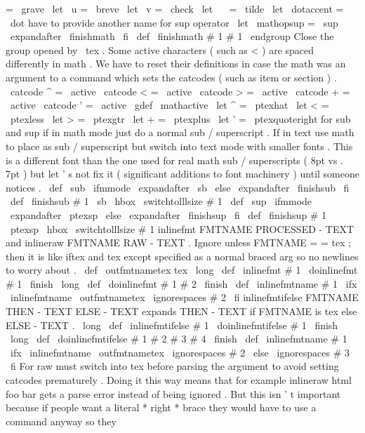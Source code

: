 {{{{=
\
grave
\
let
\
u
=
\
breve
\
let
\
v
=
\
check
\
let
\
~
=
\
tilde
\
let
\
dotaccent
=
\
dot
%
have
to
provide
another
name
for
sup
operator
\
let
\
mathopsup
=
\
sup
\
expandafter
\
finishmath
\
fi
}
\
def
\
finishmath
#
1
{
#
1
\
endgroup
}
%
Close
the
group
opened
by
\
tex
.
%
Some
active
characters
(
such
as
<
)
are
spaced
differently
in
math
.
%
We
have
to
reset
their
definitions
in
case
the
math
was
an
argument
%
to
a
command
which
sets
the
catcodes
(
such
as
item
or
section
)
.
%
{
\
catcode
^
=
\
active
\
catcode
<
=
\
active
\
catcode
>
=
\
active
\
catcode
+
=
\
active
\
catcode
'
=
\
active
\
gdef
\
mathactive
{
%
\
let
^
=
\
ptexhat
\
let
<
=
\
ptexless
\
let
>
=
\
ptexgtr
\
let
+
=
\
ptexplus
\
let
'
=
\
ptexquoteright
}
}
%
for
sub
and
sup
if
in
math
mode
just
do
a
normal
sub
/
superscript
.
%
If
in
text
use
math
to
place
as
sub
/
superscript
but
switch
%
into
text
mode
with
smaller
fonts
.
This
is
a
different
font
than
the
%
one
used
for
real
math
sub
/
superscripts
(
8pt
vs
.
7pt
)
but
let
'
s
not
%
fix
it
(
significant
additions
to
font
machinery
)
until
someone
notices
.
%
\
def
\
sub
{
\
ifmmode
\
expandafter
\
sb
\
else
\
expandafter
\
finishsub
\
fi
}
\
def
\
finishsub
#
1
{
\
sb
{
\
hbox
{
\
switchtolllsize
#
1
}
}
}
%
%
\
def
\
sup
{
\
ifmmode
\
expandafter
\
ptexsp
\
else
\
expandafter
\
finishsup
\
fi
}
\
def
\
finishsup
#
1
{
\
ptexsp
{
\
hbox
{
\
switchtolllsize
#
1
}
}
}
%
%
inlinefmt
{
FMTNAME
PROCESSED
-
TEXT
}
and
inlineraw
{
FMTNAME
RAW
-
TEXT
}
.
%
Ignore
unless
FMTNAME
=
=
tex
;
then
it
is
like
iftex
and
tex
%
except
specified
as
a
normal
braced
arg
so
no
newlines
to
worry
about
.
%
\
def
\
outfmtnametex
{
tex
}
%
\
long
\
def
\
inlinefmt
#
1
{
\
doinlinefmt
#
1
\
finish
}
\
long
\
def
\
doinlinefmt
#
1
#
2
\
finish
{
%
\
def
\
inlinefmtname
{
#
1
}
%
\
ifx
\
inlinefmtname
\
outfmtnametex
\
ignorespaces
#
2
\
fi
}
%
%
inlinefmtifelse
{
FMTNAME
THEN
-
TEXT
ELSE
-
TEXT
}
expands
THEN
-
TEXT
if
%
FMTNAME
is
tex
else
ELSE
-
TEXT
.
\
long
\
def
\
inlinefmtifelse
#
1
{
\
doinlinefmtifelse
#
1
\
finish
}
\
long
\
def
\
doinlinefmtifelse
#
1
#
2
#
3
#
4
\
finish
{
%
\
def
\
inlinefmtname
{
#
1
}
%
\
ifx
\
inlinefmtname
\
outfmtnametex
\
ignorespaces
#
2
\
else
\
ignorespaces
#
3
\
fi
}
%
%
For
raw
must
switch
into
tex
before
parsing
the
argument
to
avoid
%
setting
catcodes
prematurely
.
Doing
it
this
way
means
that
for
%
example
inlineraw
{
html
foo
{
bar
}
gets
a
parse
error
instead
of
being
%
ignored
.
But
this
isn
'
t
important
because
if
people
want
a
literal
%
*
right
*
brace
they
would
have
to
use
a
command
anyway
so
they
}}}}
